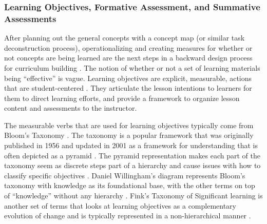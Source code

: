 \documentclass[010-intro.tex]{subfiles}
\begin{document}
    \subsubsection{Learning Objectives, Formative Assessment, and Summative Assessments}

        After planning out the general concepts with a concept map (or similar task deconstruction process),
        operationalizing and creating measures for whether or not concepts are being learned are the next
        steps in a backward design process for curriculum building
        \cite{wilson2019teaching}.
        The notion of whether or not a set of learning materials being ``effective'' is vague.
        Learning objectives are explicit, measurable, actions that are student-centered
        \cite{ambrose2010learning}.
        They articulate the lesson intentions to learners for them to direct learning efforts,
        and provide a framework to organize lesson content and assessments to the instructor.

        The measurable verbs that are used for learning objectives typically come from Bloom's Taxonomy
        \cite{ambrose2010learning, wilson2019teaching, andersonTaxonomyLearningTeaching2001}.
        The taxonomy is a popular framework that was originally published in 1956 and updated in 2001
        as a framework for understanding that is often depicted as a pyramid
        \cite{bloomTaxonomyEducationalObjectives1956, andersonTaxonomyLearningTeaching2001, dunloskyImprovingStudentsLearning2013}.
        The pyramid representation makes each part of the taxonomy seem as discrete steps part of a hierarchy
        and cause issues with how to classify specific objectives
        \cite{masapanta-carrionSystematicReviewUse2018}.
        Daniel Willingham's diagram represents Bloom's taxonomy with knowledge as its foundational base,
        with the other terms on top of ``knowledge'' without any hierarchy
        \cite{DonaldClarkPlan2020, dunloskyImprovingStudentsLearning2013}.
        Fink's Taxonomy of Significant learning is another set of terms that looks at learning objectives as a complementary
        evolution of change and is typically represented in a non-hierarchical manner
        \cite{finkCreatingSignificantLearning2013}.
\end{document}
